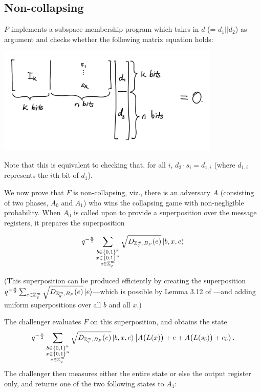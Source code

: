 \documentclass{article}
\begin{document}
\subsection{Non-collapsing}
$P$ implements a subspace membership program which takes in $d$ (= $d_1 || d_2$) as argument and checks whether the following matrix equation holds:
\begin{center}
\includegraphics[width=0.8\textwidth]{Diagrams/1.png}
\end{center}

Note that this is equivalent to checking that, for all $i$, $d_2 \cdot s_i = d_{1, i}$ (where $d_{1, i}$ represents the $i$th bit of $d_1$).

We now prove that $F$ is non-collapsing, viz., there is an adversary $A$ (consisting of two phases, $A_0$ and $A_1$) who wins the collapsing game with non-negligible probability. When $A_0$ is called upon to provide a superposition over the message registers, it prepares the superposition

\begin{align}
	q^{-\frac{n}{2}} \sum_{\substack{b \in \{0,1\}^k \\ x \in \{0,1\}^n \\ e \in \mathbb{Z}_q^m}} \sqrt{D_{\mathbb{Z}_q^m, B_P}(e)} \ket{b, x, e}
\end{align}

(This superposition can be produced efficiently by creating the superposition $q^{-\frac{n}{2}} \sum_{e \in \mathbb{Z}_q^m} \sqrt{D_{\mathbb{Z}_q^m, B_P}(e)} \ket{e}$---which is possible by Lemma 3.12 of \cite{reg05}---and adding uniform superpositions over all $b$ and all $x$.)

The challenger evaluates $F$ on this superposition, and obtains the state
\begin{align}
    q^{-\frac{n}{2}} \sum_{\substack{b \in \{0,1\}^k \\ x \in \{0,1\}^n \\ e \in \mathbb{Z}_q^m}} \sqrt{D_{\mathbb{Z}_q^m, B_P}(e)} \ket{b, x, e} \Ket{A\big( L(x) \big) + e + A\big( L(s_b) \big) + e_b}.
\end{align}
The challenger then measures either the entire state or else the output register only, and returns one of the two following states to $A_1$:
\end{document}

